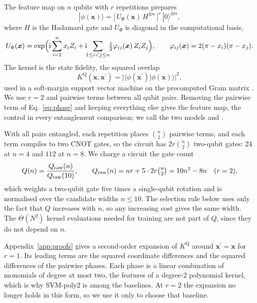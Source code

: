 The \ZZ{} feature map on $n$ qubits with $r$ repetitions \cite{havlicek2019} prepares
\begin{equation}
\label{eq:featuremap}
  |\phi(\bm{x})\rangle = \bigl[\,U_{\Phi}(\bm{x})\,H^{\otimes n}\,\bigr]^{r}\,|0\rangle^{\otimes n},
\end{equation}
where $H$ is the Hadamard gate and $U_{\Phi}$ is diagonal in the computational basis,
\begin{equation}
\label{eq:phase}
  U_{\Phi}(\bm{x}) = \exp\Bigl(\mathrm{i}\sum_{i=1}^{n} x_i Z_i
    + \mathrm{i}\!\!\sum_{1\le i<j\le n}\!\!\tfrac{1}{2}\varphi_{ij}(\bm{x})\,Z_iZ_j\Bigr),
  \qquad \varphi_{ij}(\bm{x}) = 2(\pi-x_i)(\pi-x_j).
\end{equation}
The kernel is the state fidelity, the squared overlap
\begin{equation}
\label{eq:kernel}
  K^{\mathrm{Q}}(\bm{x},\bm{x}^{\prime}) = \bigl|\langle\phi(\bm{x}^{\prime})|\phi(\bm{x})\rangle\bigr|^{2},
\end{equation}
used in a soft-margin support vector machine on the precomputed Gram matrix
\cite{cortes1995,scholkopf2002,schuld2019}. We use $r=2$ and pairwise terms between all qubit
pairs. Removing the pairwise term of Eq.~\eqref{eq:phase} and keeping everything else gives the
\Zmap{} feature map, the control in every entanglement comparison; we call the two models
\QSVM{} and \QSVMZ{}.

With all pairs entangled, each repetition places $\binom{n}{2}$ pairwise terms, and each term
compiles to two CNOT gates, so the circuit has $2r\binom{n}{2}$ two-qubit gates: $24$ at $n=4$
and $112$ at $n=8$. We charge a circuit the gate count
\begin{equation}
\label{eq:cost}
  Q(n) = \frac{Q_{\mathrm{raw}}(n)}{Q_{\mathrm{raw}}(10)}, \qquad
  Q_{\mathrm{raw}}(n) = nr + 5\cdot 2r\tbinom{n}{2} = 10n^{2}-8n \quad (r=2),
\end{equation}
which weights a two-qubit gate five times a single-qubit rotation and is normalised over the
candidate widths $n\le10$. The selection rule below uses only the fact that $Q$ increases with
$n$, so any increasing cost gives the same width. The $\Theta(N^2)$ kernel evaluations needed
for training are not part of $Q$, since they do not depend on $n$.

Appendix~\ref{app:proofs} gives a second-order expansion of $K^{\mathrm{Q}}$ around
$\bm{x}^{\prime}=\bm{x}$ for $r=1$. Its leading terms are the squared coordinate differences
and the squared differences of the pairwise phases. Each phase is a linear combination of
monomials of degree at most two, the features of a degree-2 polynomial kernel, which is why
SVM-poly2 is among the baselines. At $r=2$ the
expansion no longer holds in this form, so we use it only to choose that baseline.

